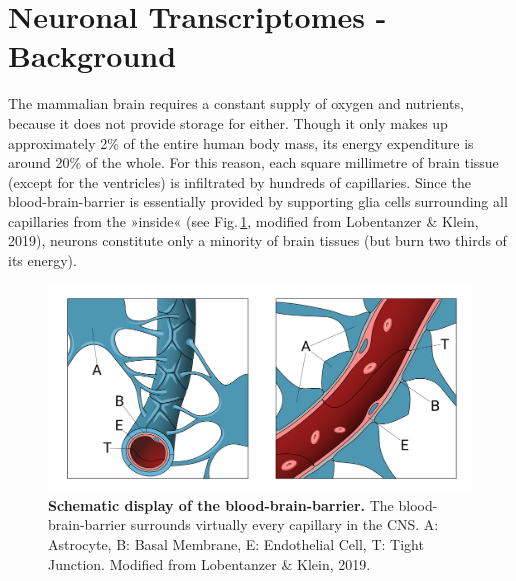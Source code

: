 \section{Neuronal Transcriptomes - Background}
The mammalian brain requires a constant supply of oxygen and nutrients, because it does not provide storage for either. Though it only makes up approximately 2\% of the entire human body mass, its energy expenditure is around 20\% of the whole\cite{Raichle2002}. For this reason, each square millimetre of brain tissue (except for the ventricles) is infiltrated by hundreds of capillaries\cite{Bohn2016}. Since the blood-brain-barrier is essentially provided by supporting glia cells surrounding all capillaries from the »inside« (see Fig.\,\ref{fig:bbb}, modified from Lobentanzer \& Klein, 2019\cite{Lobentanzer2019b}), neurons constitute only a minority of brain tissues (but burn two thirds of its energy).

\begin{figure}
\includegraphics[width=\textwidth]{figures/bbb}
\caption[The blood-brain-barrier.]{\textbf{Schematic display of the blood-brain-barrier.} The blood-brain-barrier surrounds virtually every capillary in the CNS. A: Astrocyte, B: Basal Membrane, E: Endothelial Cell, T: Tight Junction. Modified from Lobentanzer \& Klein, 2019\cite{Lobentanzer2019b}.
\label{fig:bbb}}
\end{figure}

